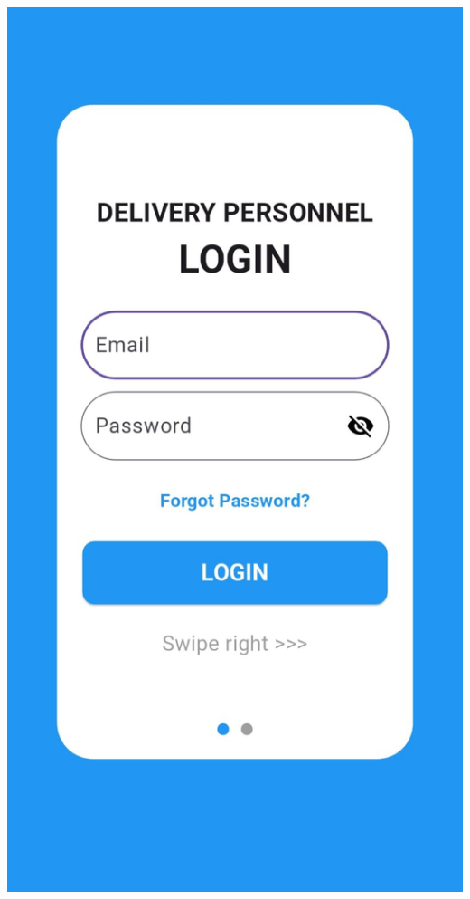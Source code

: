 \begin{center}
    \vspace{1cm} %
    
    \begin{minipage}{0.3\textwidth}  %
        \centering
        \includegraphics[width=\linewidth]{6/Mobile_login.jpg}
    \end{minipage}
\end{center}
